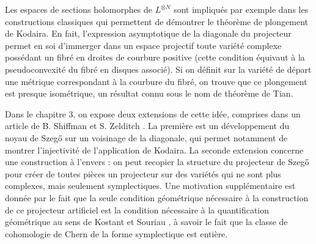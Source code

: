 Les espaces de sections holomorphes de
$L^{\otimes N}$ sont impliqués par exemple dans les constructions classiques qui permettent de démontrer le théorème de plongement de Kodaira. En fait, l'expression asymptotique de la diagonale du projecteur permet en soi d'immerger dans un espace projectif toute variété complexe possédant un fibré en droites de courbure positive (cette condition équivaut à la pseudoconvexité du fibré en disques associé). Si on définit sur la variété de départ une métrique correspondant à la courbure du fibré, on trouve que ce plongement est presque isométrique, un résultat connu sous le nom de théorème de Tian. 

Dans le chapitre 3, on expose deux extensions de cette idée, comprises dans un article de B. Shiffman et S. Zelditch \cite{Shiffman2002}. La première est un développement du noyau de Szeg\H{o} sur un voisinage de la diagonale, qui permet notamment de montrer l'injectivité de l'application de Kodaira. La seconde extension concerne une construction \og à l'envers \fg : on peut recopier la structure du projecteur de Szeg\H{o} pour créer de toutes pièces un projecteur sur des variétés qui ne sont plus complexes, mais seulement symplectiques. Une motivation supplémentaire est donnée par le fait que la seule condition géométrique nécessaire à la construction de ce projecteur artificiel est la condition nécessaire à la quantification géométrique au sens de Kostant et Souriau \cite{woodhouse1997geometric}, à savoir le fait que la classe de cohomologie de Chern de la forme symplectique est entière. 
